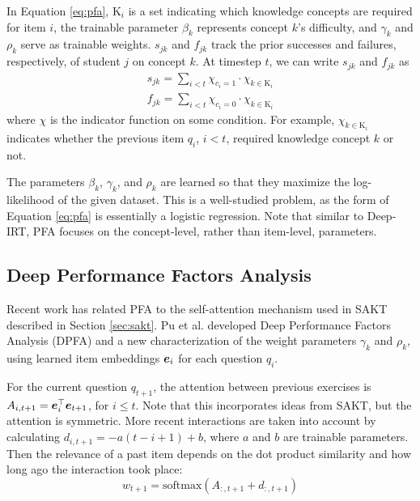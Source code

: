 In Equation \ref{eq:pfa}, $\text{K}_i$ is a set indicating which knowledge concepts are required for item $i$, the trainable parameter $\beta_k$ represents concept $k$'s difficulty, and $\gamma_k$ and $\rho_k$ serve as trainable weights. $s_{jk}$ and $f_{jk}$ track the prior successes and failures, respectively, of student $j$ on concept $k$. At timestep $t$, we can write $s_{jk}$ and $f_{jk}$ as 
\begin{equation}
  \begin{split}
    s_{jk} = \sum_{i<t} \chi_{c_i=1} \cdot \chi_{k \in \text{K}_i} \\
    f_{jk} = \sum_{i<t} \chi_{c_i=0} \cdot \chi_{k \in \text{K}_i}
  \end{split}
  \label{eq:pfa_indicator}
\end{equation}
where $\chi$ is the indicator function on some condition. For example, $\chi_{k\in \text{K}_i}$ indicates whether the previous item $q_i$, $i<t$, required knowledge concept $k$ or not.

The parameters $\beta_k$, $\gamma_k$, and $\rho_k$ are learned so that they maximize the log-likelihood of the given dataset. This is a well-studied problem, as the form of Equation \ref{eq:pfa} is essentially a logistic regression. Note that similar to Deep-IRT, PFA focuses on the concept-level, rather than item-level, parameters. 

\subsection{Deep Performance Factors Analysis}
Recent work has related PFA to the self-attention mechanism used in SAKT described in Section \ref{sec:sakt}. Pu et al. \cite{deep_pfa} developed Deep Performance Factors Analysis (DPFA) and a new characterization of the weight parameters $\gamma_k$ and $\rho_k$, using learned item embeddings $\boldsymbol{e}_i$ for each question $q_i$.

For the current question $q_{t+1}$, the attention between previous exercises is $A_{i,t+1} = \boldsymbol{e}_i^\top \boldsymbol{e}_{t+1}$, for $i \leq t$. Note that this incorporates ideas from SAKT, but the attention is symmetric. More recent interactions are taken into account by calculating $d_{i,t+1} = -a(t-i+1)+b$, where $a$ and $b$ are trainable parameters. Then the relevance of a past item depends on the dot product similarity and how long ago the interaction took place:
\begin{equation}
  w_{t+1} = \text{softmax}(A_{:,t+1} + d_{:,t+1})
  \label{eq:time_bias_attn}
\end{equation}

